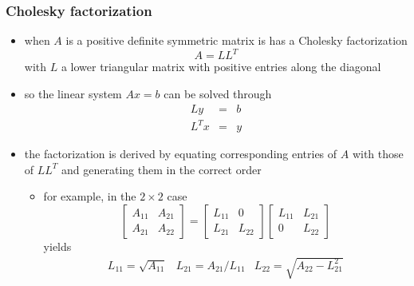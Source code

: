 \begin{frame}[fragile]
%
  \frametitle{Cholesky factorization}
%
  \begin{itemize}
%
  \item when $A$ is a positive definite symmetric matrix is has a Cholesky factorization
    \begin{equation}
      A = L L^{T}
    \end{equation}
    with $L$ a lower triangular matrix with positive entries along the diagonal
%
  \item so the linear system $Ax=b$ can be solved through
    \begin{eqnarray}
      L y & = & b \\
      L^{T} x & = & y 
    \end{eqnarray}
%
  \item the factorization is derived by equating corresponding entries of $A$ with those of $L
    L^{T}$ and generating them in the correct order
    \begin{itemize}
    \item for example, in the $2 \times 2$ case
      \begin{equation}
        \left[
          \begin{array}{cc}
            A_{11} & A_{21} \\
            A_{21} & A_{22}
          \end{array}
        \right]
        =
        \left[
          \begin{array}{cc}
            L_{11} & 0 \\
            L_{21} & L_{22}
          \end{array}
        \right]
        \left[
          \begin{array}{cc}
            L_{11} & L_{21} \\
            0 & L_{22}
          \end{array}
        \right]
      \end{equation}
      yields
      \begin{eqnarray}
        L_{11} = \sqrt{A_{11}} & 
        L_{21} = A_{21}/L_{11} & 
        L_{22} = \sqrt{A_{22} - L_{21}^{2}}
      \end{eqnarray}
      

    \end{itemize}
% 
  \end{itemize}
%
\end{frame}

